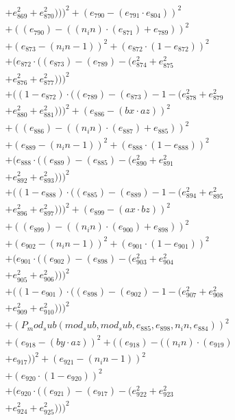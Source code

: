 \documentclass[10pt, a4paper]{article}
\begin{document}
\begin{align*}
& + e_{869}^{2} + e_{870}^{2})))^{2} + (e_{790} - (e_{791}  \cdot  e_{804}))^{2} \\
& + ((e_{790}) - ((n_in)  \cdot  (e_{871}) + e_{789}))^{2} \\
& + (e_{873} - (n_in - 1))^{2} + (e_{872}  \cdot  (1 - e_{872}))^{2} \\
& + (e_{872}  \cdot  ((e_{873}) - (e_{789}) - (e_{874}^{2} + e_{875}^{2} \\
& + e_{876}^{2} + e_{877}^{2})))^{2} \\
& + ((1 - e_{872})  \cdot  ((e_{789}) - (e_{873}) - 1 - (e_{878}^{2} + e_{879}^{2} \\
& + e_{880}^{2} + e_{881}^{2})))^{2} + (e_{886} - (bx  \cdot  az))^{2} \\
& + ((e_{886}) - ((n_in)  \cdot  (e_{887}) + e_{885}))^{2} \\
& + (e_{889} - (n_in - 1))^{2} + (e_{888}  \cdot  (1 - e_{888}))^{2} \\
& + (e_{888}  \cdot  ((e_{889}) - (e_{885}) - (e_{890}^{2} + e_{891}^{2} \\
& + e_{892}^{2} + e_{893}^{2})))^{2} \\
& + ((1 - e_{888})  \cdot  ((e_{885}) - (e_{889}) - 1 - (e_{894}^{2} + e_{895}^{2} \\
& + e_{896}^{2} + e_{897}^{2})))^{2} + (e_{899} - (ax  \cdot  bz))^{2} \\
& + ((e_{899}) - ((n_in)  \cdot  (e_{900}) + e_{898}))^{2} \\
& + (e_{902} - (n_in - 1))^{2} + (e_{901}  \cdot  (1 - e_{901}))^{2} \\
& + (e_{901}  \cdot  ((e_{902}) - (e_{898}) - (e_{903}^{2} + e_{904}^{2} \\
& + e_{905}^{2} + e_{906}^{2})))^{2} \\
& + ((1 - e_{901})  \cdot  ((e_{898}) - (e_{902}) - 1 - (e_{907}^{2} + e_{908}^{2} \\
& + e_{909}^{2} + e_{910}^{2})))^{2} \\
& + (P_mod_sub(mod_sub, mod_sub, e_{885}, e_{898}, n_in, e_{884}))^{2} \\
& + (e_{918} - (by  \cdot  az))^{2} + ((e_{918}) - ((n_in)  \cdot  (e_{919}) \\
& + e_{917}))^{2} + (e_{921} - (n_in - 1))^{2} \\
& + (e_{920}  \cdot  (1 - e_{920}))^{2} \\
& + (e_{920}  \cdot  ((e_{921}) - (e_{917}) - (e_{922}^{2} + e_{923}^{2} \\
& + e_{924}^{2} + e_{925}^{2})))^{2} \\

\end{align*}
\end{document}
